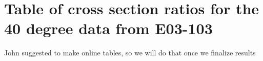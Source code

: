 \section{Table of cross section ratios for the 40 degree data from E03-103}\label{apndxa.sec}

John suggested to make online tables, so we will do that once we finalize
results
